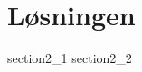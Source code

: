 \documentclass[class=report, crop=false]{standalone}
\begin{document}
    \chapter{Løsningen}
    \label{kapitel2}
    {section2_1}
    \newpage
    {section2_2}
\end{document}
